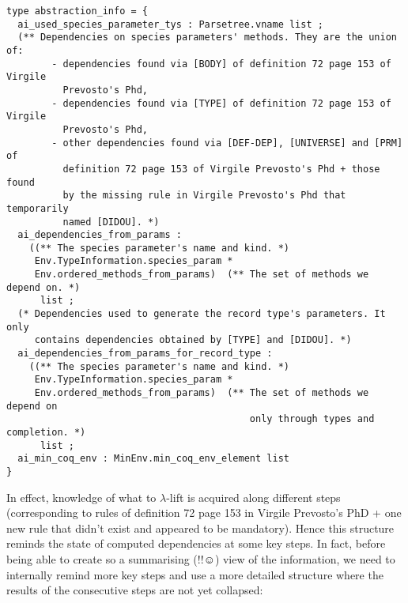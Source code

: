 {\footnotesize
\begin{lstlisting}[language=MyOCaml]
type abstraction_info = {
  ai_used_species_parameter_tys : Parsetree.vname list ;
  (** Dependencies on species parameters' methods. They are the union of:
        - dependencies found via [BODY] of definition 72 page 153 of Virgile
          Prevosto's Phd,
        - dependencies found via [TYPE] of definition 72 page 153 of Virgile
          Prevosto's Phd,
        - other dependencies found via [DEF-DEP], [UNIVERSE] and [PRM] of
          definition 72 page 153 of Virgile Prevosto's Phd + those found
          by the missing rule in Virgile Prevosto's Phd that temporarily
          named [DIDOU]. *)
  ai_dependencies_from_params :
    ((** The species parameter's name and kind. *)
     Env.TypeInformation.species_param *
     Env.ordered_methods_from_params)  (** The set of methods we depend on. *)
      list ;
  (* Dependencies used to generate the record type's parameters. It only
     contains dependencies obtained by [TYPE] and [DIDOU]. *)
  ai_dependencies_from_params_for_record_type :
    ((** The species parameter's name and kind. *)
     Env.TypeInformation.species_param *
     Env.ordered_methods_from_params)  (** The set of methods we depend on
                                           only through types and completion. *)
      list ;
  ai_min_coq_env : MinEnv.min_coq_env_element list
}
\end{lstlisting}}

In effect, knowledge of what to $\lambda$-lift is acquired along
different steps (corresponding to rules of definition 72 page 153 in
Virgile Prevosto's PhD + one new rule that didn't exist and appeared
to be mandatory). Hence this structure reminds the state of computed
dependencies at some key steps. In fact, before being able to create
so a summarising (!!$\smiley$) view of the information, we need to
internally remind more key steps and use a more detailed structure
where the results of the consecutive steps are not yet collapsed:

